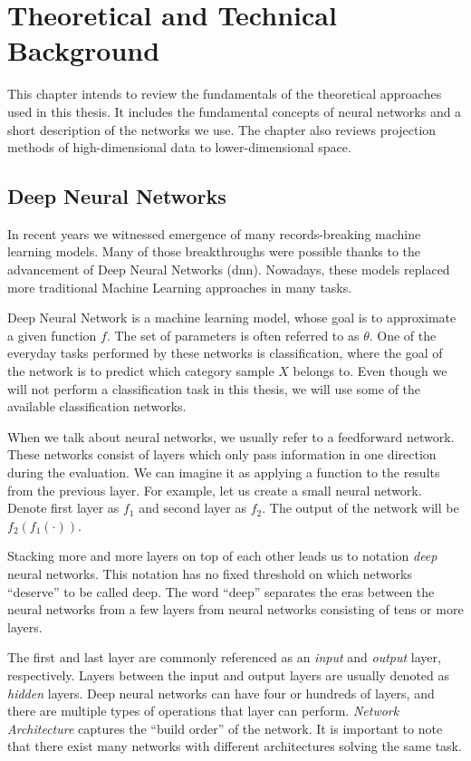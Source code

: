\chapter{Theoretical and Technical Background}
\label{ch:technical_background}

This chapter intends to review the fundamentals of the theoretical approaches used in this thesis. It includes the fundamental concepts of neural networks and a short description of the networks we use. The chapter also reviews projection methods of high-dimensional data to lower-dimensional space.

\section{Deep Neural Networks}

In recent years we witnessed emergence of many records-breaking machine learning models. Many of those breakthroughs were possible thanks to the advancement of Deep Neural Networks (\acrshort{dnn}). Nowadays, these models replaced more traditional Machine Learning approaches in many tasks.

Deep Neural Network is a machine learning model, whose goal is to approximate a given function \(f\). The set of parameters is often referred to as \(\theta\). One of the everyday tasks performed by these networks is classification, where the goal of the network is to predict which category sample \(X\) belongs to. Even though we will not perform a classification task in this thesis, we will use some of the available classification networks.

When we talk about neural networks, we usually refer to a feedforward network. These networks consist of layers which only pass information in one direction during the evaluation. We can imagine it as applying a function to the results from the previous layer. For example, let us create a small neural network. Denote first layer as \(f_1\) and second layer as \(f_2\). The output of the network will be \(f_2\left(f_1\left(\cdot\right)\right)\).

Stacking more and more layers on top of each other leads us to notation \emph{deep} neural networks. This notation has no fixed threshold on which networks ``deserve'' to be called deep. The word ``deep'' separates the eras between the neural networks from a few layers from neural networks consisting of tens or more layers.  

The first and last layer are commonly referenced as an \emph{input} and \emph{output} layer, respectively. Layers between the input and output layers are usually denoted as \emph{hidden} layers. Deep neural networks can have four or hundreds of layers, and there are multiple types of operations that layer can perform. \emph{Network Architecture} captures the ``build order'' of the network. It is important to note that there exist many networks with different architectures solving the same task.

